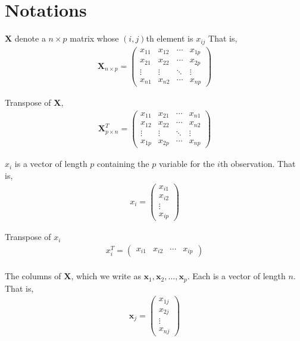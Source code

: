     \documentclass[12pt,a4paper]{article}%
\theoremstyle{definition}
\theoremstyle{plain}
\numberwithin{equation}{section}
\begin{document}
\section{Notations}

$\mathbf{X}$ denote a $n \times p$ matrix whose $(i,j)$th element is $x_{ij}$ That is,
\begin{gather}
\mathbf{X}_{n \times p} = \begin{pmatrix}
  x_{11} & x_{12} & \cdots & x_{1p}  \\
  x_{21} & x_{22} & \cdots & x_{2p}  \\
  \vdots & \vdots & \ddots & \vdots  \\
  x_{n1} & x_{n2} & \cdots & x_{np}
 \end{pmatrix}
\end{gather}

Transpose of $\mathbf{X}$,
\begin{gather}
\mathbf{X}^{T}_{p \times n} = \begin{pmatrix}
  x_{11} & x_{21} & \cdots & x_{n1}  \\
  x_{12} & x_{22} & \cdots & x_{n2}  \\
  \vdots & \vdots & \ddots & \vdots  \\
  x_{1p} & x_{2p} & \cdots & x_{np}
 \end{pmatrix}
\end{gather}

$x_{i}$ is a vector of length $p$ containing the $p$ variable for the $i$th observation. That is,
\begin{gather}
x_{i} = \begin{pmatrix}
  x_{i1} \\
  x_{i2} \\
  \vdots \\
  x_{ip} 
 \end{pmatrix}
\end{gather}

Transpose of $x_{i}$
\begin{gather}
x_{i}^{T} = \begin{pmatrix}
  x_{i1} & x_{i2} & \cdots & x_{ip}
 \end{pmatrix}
\end{gather}
~\\

The columns of $\mathbf{X}$, which we write as $\mathbf{x}_{1},\mathbf{x}_{2},\dots,\mathbf{x}_{p}$.
Each is a vector of length $n$. That is,
\begin{gather}
\mathbf{x}_{j} = \begin{pmatrix}
  x_{1j} \\
  x_{2j} \\
  \vdots \\
  x_{nj} 
 \end{pmatrix}
\end{gather}
\end{document}
